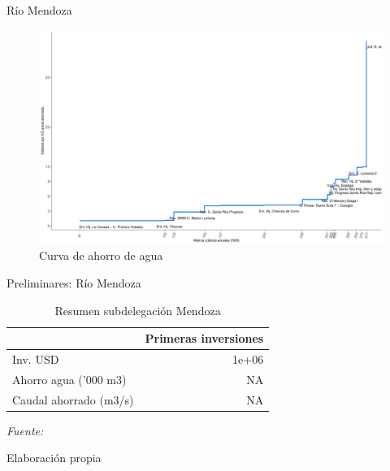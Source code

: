 \documentclass{beamer}\usepackage[]{graphicx}\usepackage[]{color}
\makeatletter
\def\maxwidth{ %
  \ifdim\Gin@nat@width>\linewidth
    \linewidth
  \else
    \Gin@nat@width
  \fi
}
\makeatother
\begin{document}
\begin{frame}{Río Mendoza}
\begin{figure}

{\centering \includegraphics[width=\maxwidth,]{figure/AhorroMzaPerd-1} 

}

\caption[\label{AhorroMzaPerd}Curva de ahorro de agua]{\label{AhorroMzaPerd}Curva de ahorro de agua}\label{fig:AhorroMzaPerd}
\end{figure}


\end{frame}

\begin{frame}{Preliminares: Río Mendoza}
\vspace{-.55cm}
\begin{table}[H]

\caption{\label{tab:MendozaInv}\label{MendozaInv}Resumen subdelegación Mendoza}
\centering
\fontsize{10}{12}\selectfont
\begin{threeparttable}
\begin{tabular}[t]{lr}
\toprule
  & Primeras inversiones\\
\midrule
Inv. USD & 1e+06\\
Ahorro agua ('000 m3) & NA\\
Caudal ahorrado (m3/s) & NA\\
\bottomrule
\end{tabular}
\begin{tablenotes}[para]
\item \textit{Fuente: } 
\item Elaboración propia
\end{tablenotes}
\end{threeparttable}
\end{table}


\end{frame}
\end{document}

